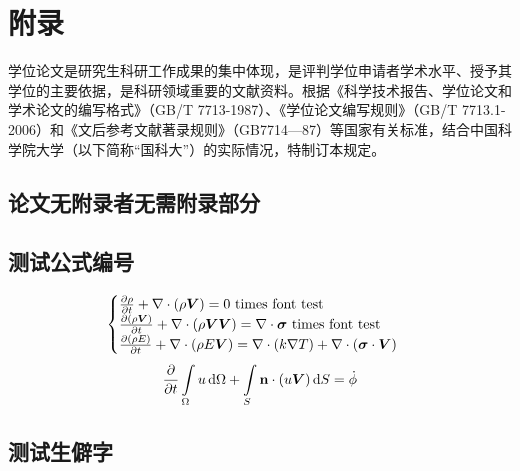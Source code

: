 \chapter{附录}

学位论文是研究生科研工作成果的集中体现，是评判学位申请者学术水平、授予其学位的主要依据，是科研领域重要的文献资料。根据《科学技术报告、学位论文和学术论文的编写格式》（GB/T 7713-1987）、《学位论文编写规则》（GB/T 7713.1-2006）和《文后参考文献著录规则》（GB7714—87）等国家有关标准，结合中国科学院大学（以下简称“国科大”）的实际情况，特制订本规定。

\section{论文无附录者无需附录部分}

\section{测试公式编号} \label{sec:testmath}

\begin{equation} \label{eq:appedns}
    \begin{cases}
        \frac{\partial \rho}{\partial t} + \nabla\cdot(\rho\Vector{V}) = 0 \ \mathrm{times\ font\ test}\\
        \frac{\partial (\rho\Vector{V})}{\partial t} + \nabla\cdot(\rho\Vector{V}\Vector{V}) = \nabla\cdot\Tensor{\sigma} \ \text{times font test}\\
        \frac{\partial (\rho E)}{\partial t} + \nabla\cdot(\rho E\Vector{V}) = \nabla\cdot(k\nabla T) + \nabla\cdot(\Tensor{\sigma}\cdot\Vector{V})
    \end{cases}
\end{equation}
\begin{equation}
    \frac{\partial }{\partial t}\int\limits_{\Omega} u \, \mathrm{d}\Omega + \int\limits_{S} \boldsymbol{\mathbf{n}}\cdot(u\boldsymbol{V}) \, \mathrm{d}S = \dot{\phi}
\end{equation}

\section{测试生僻字}

